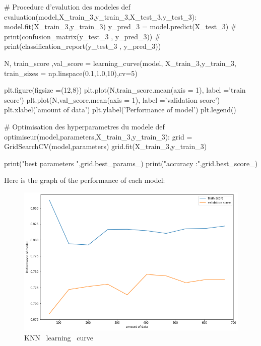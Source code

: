 \documentclass[12pt]{article}
\begin{document}
\begin{customFrame}
# Procedure d'evalution des modeles
def evaluation(model,X_train_3,y_train_3,X_test_3,y_test_3):
    model.fit(X_train_3,y_train_3)
    y_pred_3 = model.predict(X_test_3)
    # print(confusion_matrix(y_test_3 , y_pred_3))
    # print(classification_report(y_test_3 , y_pred_3))

    N, train_score ,val_score = learning_curve(model, X_train_3,y_train_3,
                            train_sizes = np.linspace(0.1,1.0,10),cv=5)

    plt.figure(figsize =(12,8))
    plt.plot(N,train_score.mean(axis = 1), label ='train score')
    plt.plot(N,val_score.mean(axis = 1), label ='validation score')
    plt.xlabel('amount of data')
    plt.ylabel('Performance of model')
    plt.legend()


# Optimisation des hyperparametres du modele 
def optimiseur(model,parameters,X_train_3,y_train_3):
    grid = GridSearchCV(model,parameters)
    grid.fit(X_train_3,y_train_3)

    print("best parameters ",grid.best_params_)
    print("accuracy :",grid.best_score_)

\end{customFrame}
Here is the graph of the performance of each model: 


\begin{figure}[H]
\begin{center}
\includegraphics[scale=0.5]{learning_curve_1.png} 
\caption[]{ KNN \ learning \ curve }
\end{center}
\end{figure}
\end{document}
